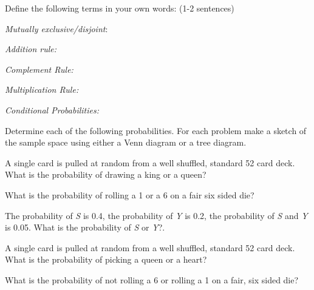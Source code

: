  
 
\begin{problem}
  \item Define the following terms in your own words: (1-2 sentences) 

    \begin{subproblem}
      \item \textit{Mutually exclusive/disjoint}: 
        \vfill
      \item \textit{Addition rule:} 
        \vfill
      \item \textit{Complement Rule:} 
        \vfill
      \item \textit{Multiplication Rule:} 
        \vfill
      \item \textit{Conditional Probabilities:}  
        \vfill
    \end{subproblem}

  \item Determine each of the following probabilities. For each
    problem make a sketch of the sample space using either a Venn
    diagram or a tree diagram.

  \begin{subproblem}

  \item A single card is pulled at random from a well shuffled,
    standard 52 card deck. What is the probability of drawing a king
    or a queen?

    \vfill
    \vfill

    \clearpage

  \item What is the probability of rolling a 1 or a 6 on a fair six
    sided die?

    \vfill

  \item The probability of \textit{S} is 0.4, the probability of
    \textit{Y} is 0.2, the probability of \textit{S} and \textit{Y} is
    0.05. What is the probability of \textit{S} or \textit{Y}?.

    \vfill

  \item A single card is pulled at random from a well shuffled,
    standard 52 card deck. What is the probability of picking a queen
    or a heart?

    \vfill

  \item What is the probability of not rolling a 6 or rolling a 1 on a
    fair, six sided die?


\end{subproblem}
\end{problem}
